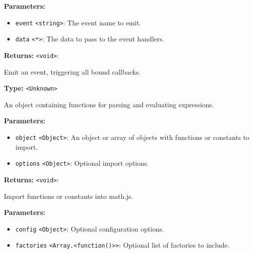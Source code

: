 \documentclass[12pt,a4paper]{article}
\begin{document}
\vspace{5mm}
\noindent {}


\noindent \textbf{Parameters:}
\begin{itemize}
  \item \texttt{event} \texttt{<string>}: The event name to emit.
  \item \texttt{data} \texttt{<*>}: The data to pass to the event handlers.
\end{itemize}

\noindent \textbf{Returns:} \texttt{<void>}: 

\noindent Emit an event, triggering all bound callbacks.

\vspace{5mm}
\noindent {}\vspace{4mm}


\noindent \textbf{Type:} \texttt{<Unknown>}

\noindent An object containing functions for parsing and evaluating expressions.

\vspace{5mm}
\noindent {}


\noindent \textbf{Parameters:}
\begin{itemize}
  \item \texttt{object} \texttt{<Object>}: An object or array of objects with functions or constants to import.
  \item \texttt{options} \texttt{<Object>}: Optional import options.
\end{itemize}

\noindent \textbf{Returns:} \texttt{<void>}: 

\noindent Import functions or constants into math.js.

\vspace{5mm}
\noindent {}


\noindent \textbf{Parameters:}
\begin{itemize}
  \item \texttt{config} \texttt{<Object>}: Optional configuration options.
  \item \texttt{factories} \texttt{<Array.<function()>>}: Optional list of factories to include.
\end{itemize}
\end{document}
